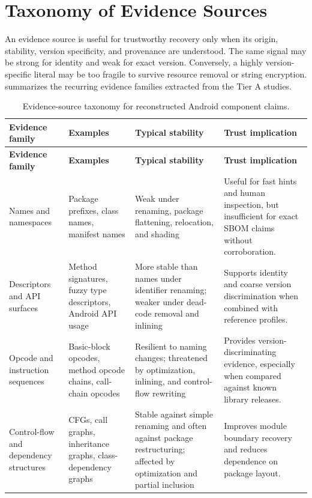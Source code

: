 \section{Taxonomy of Evidence Sources}

An evidence source is useful for trustworthy \SBOM recovery only when its
origin, stability, version specificity, and provenance are understood. The
same signal may be strong for identity and weak for exact version. Conversely,
a highly version-specific literal may be too fragile to survive resource
removal or string encryption.  summarizes
the recurring evidence families extracted from the Tier A studies.

\begingroup
\small
\renewcommand{\arraystretch}{1.15}
\begin{longtable}{p{}p{}p{}p{}}
\caption{Evidence-source taxonomy for reconstructed Android component claims.}
\label{tab:master-evidence-taxonomy}\\
\toprule
\textbf{Evidence family} & \textbf{Examples} & \textbf{Typical stability} & \textbf{Trust implication}\\
\midrule
\endfirsthead
\toprule
\textbf{Evidence family} & \textbf{Examples} & \textbf{Typical stability} & \textbf{Trust implication}\\
\midrule
\endhead
\bottomrule
\endfoot
Names and namespaces &
Package prefixes, class names, manifest names &
Weak under renaming, package flattening, relocation, and shading &
Useful for fast hints and human inspection, but insufficient for exact SBOM
claims without corroboration.\\

Descriptors and API surfaces &
Method signatures, fuzzy type descriptors, Android API usage &
More stable than names under identifier renaming; weaker under dead-code
removal and inlining &
Supports identity and coarse version discrimination when combined with
reference profiles.\\

Opcode and instruction sequences &
Basic-block opcodes, method opcode chains, call-chain opcodes &
Resilient to naming changes; threatened by optimization, inlining, and
control-flow rewriting &
Provides version-discriminating evidence, especially when compared against
known library releases.\\

Control-flow and dependency structures &
CFGs, call graphs, inheritance graphs, class-dependency graphs &
Stable against simple renaming and often against package restructuring;
affected by optimization and partial inclusion &
Improves module boundary recovery and reduces dependence on package layout.\\


\end{longtable}
